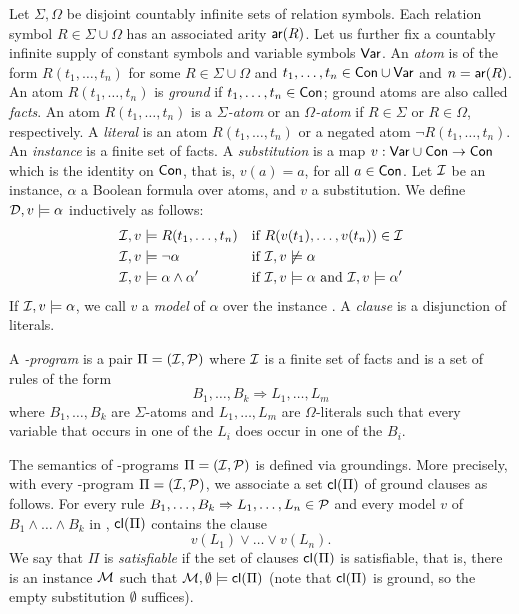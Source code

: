 \documentclass[conference]{IEEEtran}
\begin{document}
Let $\Sigma,\Omega$ be disjoint countably infinite sets of relation
symbols.  Each relation symbol $R\in \Sigma\cup\Omega$ has an
associated arity $\mathsf{ar}(R)$.  Let us further fix a countably
infinite supply of constant symbols  and variable symbols
$\mathsf{Var}$.  An \emph{atom} is of the form $R(t_1,\ldots,t_n)$ for
some $R\in \Sigma\cup\Omega$ and
$t_1,\ldots,t_n\in\mathsf{Con}\cup\mathsf{Var}$ and $n=\mathsf{ar}(R)$. An atom
$R(t_1,\ldots,t_n)$ is \emph{ground} if $t_1,\ldots,t_n\in\mathsf{Con}$;
ground atoms are also called \emph{facts}. An atom $R(t_1,\ldots,t_n)$
is a \emph{$\Sigma$-atom} or an \emph{$\Omega$-atom} if $R\in \Sigma$
or $R\in \Omega$, respectively. A \emph{literal} is an atom
$R(t_1,\ldots,t_n)$ or a negated atom $\neg R(t_1,\ldots,t_n)$. An
\emph{instance} is a finite set of facts. 
A \emph{substitution} is a map
$v:\mathsf{Var}\cup\mathsf{Con}\to\mathsf{Con}$ which is the identity on
$\mathsf{Con}$, that is, $v(a)=a$, for all $a\in\mathsf{Con}$. Let $\mathcal{I}$ be
an instance, $\alpha$ a Boolean formula over atoms, and
$v$ a substitution. We define $\mathcal{D},v\models \alpha$ inductively as
follows: 
%
\begin{align*}
  \mathcal{I},v & \models R(t_1,\ldots,t_n) && \text{if
  $R(v(t_1),\ldots,v(t_n))\in \mathcal{I}$} \\
  \mathcal{I}, v& \models \neg \alpha && \text{if $\mathcal{I},v\not\models \alpha$}
  \\
  \mathcal{I}, v& \models \alpha \wedge \alpha' && \text{if $\mathcal{I},v\models
  \alpha$ and $\mathcal{I},v\models\alpha'$}
\end{align*}
%
If $\mathcal{I},v\models\alpha$, we call $v$ a \emph{model} of $\alpha$ over
the instance \Imc. A \emph{clause} is a disjunction of literals.


A \emph{\bcore-program} is a pair $\Pi=(\mathcal{I},\mathcal{P})$ where $\mathcal{I}$ is a
finite set of facts and \Pmc is a set of rules of the form 
%
\[B_1, \ldots, B_k \Rightarrow L_1, \ldots, L_m\]
%
where $B_1,\ldots,B_k$ are $\Sigma$-atoms
and $L_1,\ldots,L_m$ are $\Omega$-literals such that every variable
that occurs in one of the $L_i$ does occur in one of the 
$B_i$.

The semantics of \bcore-programs $\Pi=(\mathcal{I},\mathcal{P})$ is defined via
groundings. More precisely, with every \bcore-program
$\Pi=(\mathcal{I},\mathcal{P})$, we associate a set $\mathsf{cl}(\Pi)$ of ground clauses
as follows.  For every rule $B_1,\ldots,B_k \Rightarrow L_1,\ldots,
L_n\in\mathcal{P}$ and every model $v$ of $B_1\wedge\ldots\wedge B_k$ in
\Imc, $\mathsf{cl}(\Pi)$ contains the clause
%
\[v(L_1)\vee\ldots\vee v(L_n).\]
%
We say that $\Pi$ is \emph{satisfiable} if the set of clauses
$\mathsf{cl}(\Pi)$ is satisfiable, that is, there is an instance $\mathcal{M}$
such that $\mathcal{M},\emptyset \models\mathsf{cl}(\Pi)$ (note that
$\mathsf{cl}(\Pi)$ is ground, so the empty substitution $\emptyset$
suffices).
\end{document}
